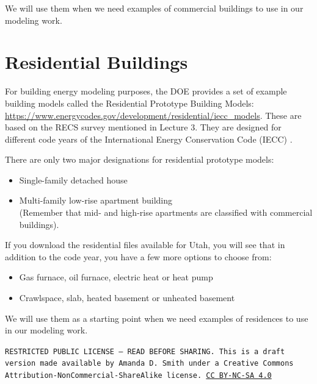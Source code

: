 \documentclass[10pt]{article}
\begin{document}
We will use them when we need examples of commercial buildings to use in our modeling work.

\section{Residential Buildings}

For building energy modeling purposes, the DOE provides a set of example building models called the Residential Prototype Building Models:  \url{https://www.energycodes.gov/development/residential/iecc_models}. These are based on the RECS survey mentioned in Lecture 3. They are designed for different code years of the International Energy Conservation Code (IECC) \cite{ashrae90.1}.

There are only two major designations for residential prototype models:
\begin{itemize}
    \setlength{\itemsep}{0pt}%
    \setlength{\parskip}{0pt}%
    \item Single-family detached house
    \item Multi-family low-rise apartment building\\(Remember that mid- and high-rise apartments are classified with commercial buildings).
\end{itemize}

If you download the residential files available for Utah, you will see that in addition to the code year, you have a few more options to choose from:

\begin{itemize}
    \setlength{\itemsep}{0pt}%
    \setlength{\parskip}{0pt}%
    \item Gas furnace, oil furnace, electric heat or heat pump
    \item Crawlspace, slab, heated basement or unheated basement
\end{itemize}

We will use them as a starting point when we need examples of residences to use in our modeling work.


\bigskip

\noindent
\texttt{\footnotesize RESTRICTED PUBLIC LICENSE --- READ BEFORE SHARING. This is a draft version made available by Amanda D. Smith under a Creative Commons Attribution-NonCommercial-ShareAlike license. 
\href{https://creativecommons.org/licenses/by-nc-sa/4.0/}{CC BY-NC-SA 4.0}}

\newpage
\printbibliography
\end{document}

